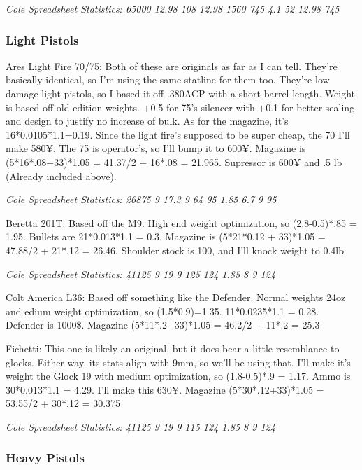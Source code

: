 \begin{multicols*}{2}
	\textit{\textcolor{OliveGreen}{Cole Spreadsheet Statistics: 65000 12.98 108 12.98 1560 745 4.1 52 12.98 745}}
	
	\subsubsection{Light Pistols}
	
	Ares Light Fire 70/75: Both of these are originals as far as I can tell. They're basically identical, so I'm using the same statline for them too. They're low damage light pistols, so I based it off .380ACP with a short barrel length. Weight is based off old edition weights.  +0.5 for 75's silencer with +0.1 for better sealing and design to justify no increase of bulk. As for the magazine, it's 16*0.0105*1.1=0.19. Since the light fire's supposed to be super cheap, the 70 I'll make 580¥. The 75 is operator's, so I'll bump it to 600¥. Magazine is (5*16*.08+33)*1.05 = 41.37/2 + 16*.08 = 21.965. Supressor is 600¥ and .5 lb (Already included above).
	
	\textit{\textcolor{OliveGreen}{Cole Spreadsheet Statistics: 26875 9 17.3 9 64 95 1.85 6.7 9 95}}
	
	Beretta 201T: Based off the M9. High end weight optimization, so (2.8-0.5)*.85 = 1.95. Bullets are 21*0.013*1.1 = 0.3. Magazine is (5*21*0.12 + 33)*1.05 = 47.88/2 + 21*.12 = 26.46. Shoulder stock is 100, and I'll knock weight to 0.4lb
	
	\textit{\textcolor{OliveGreen}{Cole Spreadsheet Statistics: 41125 9 19 9 125 124 1.85 8 9 124}}
	
	Colt America L36: Based off something like the Defender. Normal weights 24oz and edium weight optimization, so (1.5*0.9)=1.35. 11*0.0235*1.1 = 0.28. Defender is 1000\$. Magazine (5*11*.2+33)*1.05 = 46.2/2 + 11*.2 = 25.3
	
	Fichetti: This one is likely an original, but it does bear a little resemblance to glocks. Either way, its stats align with 9mm, so we'll be using that. I'll make it's weight the Glock 19 with medium optimization, so (1.8-0.5)*.9 = 1.17. Ammo is 30*0.013*1.1 = 4.29. I'll make this 630¥. Magazine (5*30*.12+33)*1.05 = 53.55/2 + 30*.12 = 30.375
	
	\textit{\textcolor{OliveGreen}{Cole Spreadsheet Statistics: 41125 9 19 9 115 124 1.85 8 9 124}}
	
	\subsubsection{Heavy Pistols}
	

\end{multicols*}
